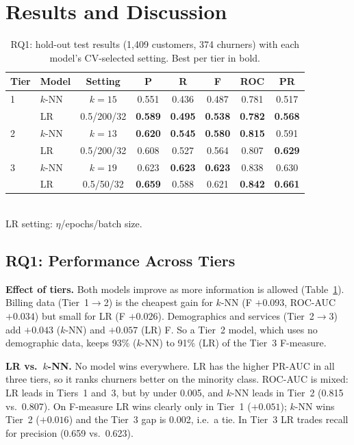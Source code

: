 \documentclass[sigconf,nonacm]{acmart}
\begin{document}
\section{Results and Discussion}
\begin{table}[t]
\caption{RQ1: hold-out test results (1,409 customers, 374 churners) with each model's CV-selected setting. Best per tier in bold.}\label{tab:rq1}
\small\setlength{\tabcolsep}{2.6pt}
\begin{tabular}{@{}llcccccc@{}}
\toprule
Tier & Model & Setting & P & R & F & ROC & PR\\
\midrule
1 & $k$-NN & $k{=}15$ & 0.551 & 0.436 & 0.487 & 0.781 & 0.517\\
  & LR & 0.5/200/32 & \textbf{0.589} & \textbf{0.495} & \textbf{0.538} & \textbf{0.782} & \textbf{0.568}\\
2 & $k$-NN & $k{=}13$ & \textbf{0.620} & \textbf{0.545} & \textbf{0.580} & \textbf{0.815} & 0.591\\
  & LR & 0.5/200/32 & 0.608 & 0.527 & 0.564 & 0.807 & \textbf{0.629}\\
3 & $k$-NN & $k{=}19$ & 0.623 & \textbf{0.623} & \textbf{0.623} & 0.838 & 0.630\\
  & LR & 0.5/50/32 & \textbf{0.659} & 0.588 & 0.621 & \textbf{0.842} & \textbf{0.661}\\
\bottomrule
\end{tabular}
\\[1pt]{\footnotesize LR setting: $\eta$/epochs/batch size.}
\end{table}

\subsection{RQ1: Performance Across Tiers}
\textbf{Effect of tiers.} Both models improve as more information is allowed (Table~\ref{tab:rq1}). Billing data (Tier~1$\to$2) is the cheapest gain for $k$-NN (F $+0.093$, ROC-AUC $+0.034$) but small for LR (F $+0.026$). Demographics and services (Tier~2$\to$3) add $+0.043$ ($k$-NN) and $+0.057$ (LR) F. So a Tier~2 model, which uses no demographic data, keeps 93\% ($k$-NN) to 91\% (LR) of the Tier~3 F-measure.

\textbf{LR vs.\ $k$-NN.} No model wins everywhere. LR has the higher PR-AUC in all three tiers, so it ranks churners better on the minority class. ROC-AUC is mixed: LR leads in Tiers~1 and~3, but by under 0.005, and $k$-NN leads in Tier~2 (0.815 vs.\ 0.807). On F-measure LR wins clearly only in Tier~1 ($+0.051$); $k$-NN wins Tier~2 ($+0.016$) and the Tier~3 gap is 0.002, i.e.\ a tie. In Tier~3 LR trades recall for precision (0.659 vs.\ 0.623).
\end{document}
